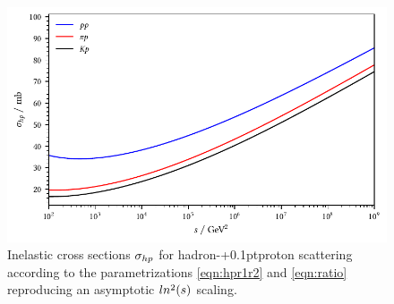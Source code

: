 \begin{figure}[H]
	\centering
	\includegraphics{../plots/build/hadron_proton_scattering.pdf}
	\caption[Inelastic cross sections $\sigma_{h \kern-0.1pt p}$ for hadron-{\kern+0.1pt}proton scattering.]
			{Inelastic cross sections $\sigma_{h \kern-0.1pt p}$ for hadron-{\kern+0.1pt}proton scattering according to the
			 parametrizations \eqref{eqn:hpr1r2} and \eqref{eqn:ratio} reproducing an asymptotic $\cramped{ln^2(s)}$ scaling.}
	\label{fig:hadron-proton-scattering}
\end{figure}
